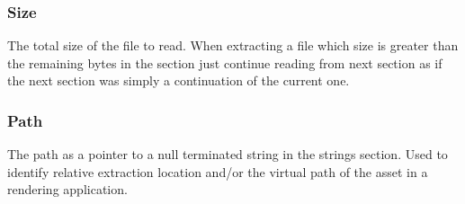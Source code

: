 \subsubsection{Size}
The total size of the file to read. When extracting a file which size is greater than the remaining bytes in the section just continue reading from next section as if the next section was simply a continuation of the current one.

\subsubsection{Path}
The path as a pointer to a null terminated string in the strings section. Used to identify relative extraction location and/or the virtual path of the asset in a rendering application.


